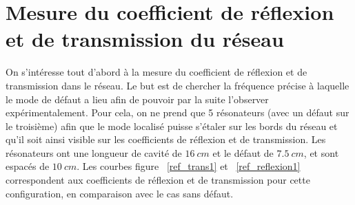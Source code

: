 \section{Mesure du coefficient de réflexion et de transmission du réseau}
On s'intéresse tout d'abord à la mesure du coefficient de réflexion et de transmission dans le réseau. Le but est de chercher la fréquence précise à laquelle le mode de défaut a lieu afin de pouvoir par la suite l'observer expérimentalement. Pour cela, on ne prend que 5 résonateurs (avec un défaut sur le troisième) afin que le mode localisé puisse s'étaler sur les bords du réseau et qu'il soit ainsi visible sur les coefficients de réflexion et de transmission. Les résonateurs ont une longueur de cavité de $16~cm$ et le défaut de $7.5~cm$, et sont espacés de $10~cm$. Les courbes figure ~\ref{ref_trans1} et ~\ref{ref_reflexion1} correspondent aux coefficients de réflexion et de transmission pour cette configuration, en comparaison avec le cas sans défaut.

